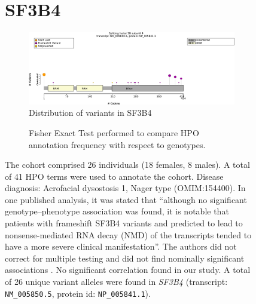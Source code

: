 \begin{figure}[htbp]
\section*{SF3B4}
\centering
\begin{subfigure}[b]{0.95\textwidth}
\centering
\includegraphics[width=\textwidth]{ img/SF3B4_protein_diagram.pdf} 
\captionsetup{justification=raggedright,singlelinecheck=false}
\caption{Distribution of variants in SF3B4}
\end{subfigure}

\vspace{2em}

\begin{subfigure}[b]{0.95\textwidth}
\centering
{}
\captionsetup{justification=raggedright,singlelinecheck=false}
\caption{Fisher Exact Test performed to compare HPO annotation frequency with respect to genotypes.}
\end{subfigure}

\vspace{2em}

\caption{The cohort comprised 26 individuals (18 females, 8 males). A total of 41 HPO terms were used to annotate the cohort. Disease diagnosis: Acrofacial dysostosis 1, Nager type (OMIM:154400). 
In one published analysis, it was stated that ``although no significant genotype–phenotype association was found, it is notable that patients with frameshift SF3B4 variants and predicted to lead to nonsense-mediated RNA 
decay (NMD) of the transcripts tended to have a more severe clinical manifestation''. The authors did not correct for multiple testing and did not find nominally significant associations \cite{PMID_35331022}.
No significant correlation found in our study. A total of 26 unique variant alleles were found in \textit{SF3B4} (transcript: \texttt{NM\_005850.5}, protein id: \texttt{NP\_005841.1}).}
\end{figure}
